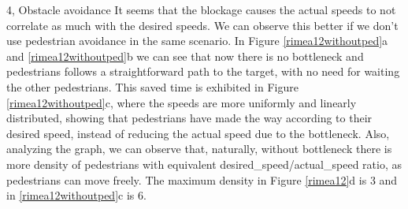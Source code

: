 \begin{task}{4, Obstacle avoidance}
It seems that the blockage causes the actual speeds to not correlate as much with the desired speeds. We can observe this better if we don't use pedestrian avoidance in the same scenario. In Figure \ref{rimea12withoutped}a and \ref{rimea12withoutped}b we can see that now there is no bottleneck and pedestrians follows a straightforward path to the target, with no need for waiting the other pedestrians. This saved time is exhibited in Figure \ref{rimea12withoutped}c, where the speeds are more uniformly and linearly distributed, showing that pedestrians have made the way according to their desired speed, instead of reducing the actual speed due to the bottleneck. Also, analyzing the graph, we can observe that, naturally, without bottleneck there is more density of pedestrians with equivalent desired\_speed/actual\_speed ratio, as pedestrians can move freely. The maximum density in Figure \ref{rimea12}d is 3 and in \ref{rimea12withoutped}c is 6.
\begin{figure}[H] 
\centering
{}
\end{figure}
\end{task}
